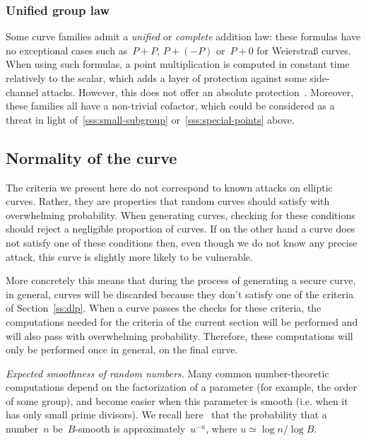 \documentclass[twocolumn,letterpaper,10pt]{article}
\begin{document}
\subsubsection{Unified group law}
\label{sss:unified}

Some curve families admit a \emph{unified} or \emph{complete}
addition law: these formulas have no exceptional cases
such as~$P + P$, $P + (-P)$ or~$P + 0$ for Weierstraß curves.
When using such formulas, a point multiplication
is computed in constant time relatively to the scalar,
which adds a layer of protection against some side-channel attacks.
However, this does not offer an absolute protection~\cite{indo2014frv}.
Moreover, these families all have a non-trivial cofactor,
which could be considered as a threat
in light of~\ref{sss:small-subgroup} or~\ref{sss:special-points} above.

\subsection{Normality of the curve}
\label{ss:normal}

The criteria we present here do not correspond to
known attacks on elliptic curves.
Rather, they are properties that random curves should satisfy
with overwhelming probability.
When generating curves, checking for these conditions
should reject a negligible proportion of curves.
If on the other hand a curve does not satisfy one of these conditions
then, even though we do not know any precise attack,
this curve is slightly more likely to be vulnerable.

More concretely this means that during the process of generating
a secure curve, in general, curves will be discarded
because they don't satisfy one of the criteria of Section~\ref{ss:dlp}.
When a curve passes the checks for these criteria,
the computations needed for the criteria of the current section
will be performed and will also pass with overwhelming probability.
Therefore, these computations will only be performed once in general,
on the final curve.
\medbreak\par\textit{Expected smoothness of random numbers.} %
Many common number-theoretic computations depend on
the factorization of a parameter (for example, the order of some group),
and become easier when this parameter is smooth
(i.e. when it has only small prime divisors).
We recall here~\cite{jnt1983cep} that the probability that
a number~$n$ be~$B$-smooth is approximately~$u^{-u}$,
where $u ≃ \log n / \log B$.
\end{document}
